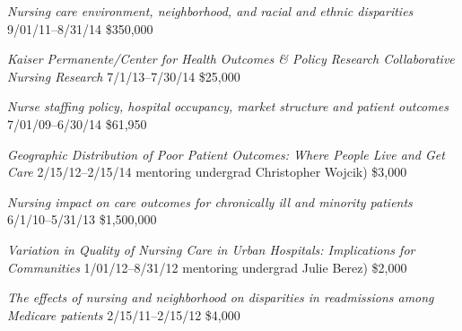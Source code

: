 \documentclass[10pt,]{article}
\begin{document}
{{{{{{{{{{{{{\textit {Nursing care environment, neighborhood, and racial and ethnic disparities} \hfill 9/01/11--8/31/14 \newline
{} \hfill \$350,000

\textit {Kaiser Permanente/Center for Health Outcomes \& Policy Research Collaborative Nursing Research} \hfill 7/1/13--7/30/14 \newline
{} \hfill \$25,000

\textit {Nurse staffing policy, hospital occupancy, market structure and patient outcomes} \hfill 7/01/09--6/30/14 \newline
{} \hfill \$61,950

\textit {Geographic Distribution of Poor Patient Outcomes: Where People Live and Get Care} \hfill 2/15/12--2/15/14 \newline
{ mentoring undergrad Christopher Wojcik)}	\hfill \$3,000

\textit {Nursing impact on care outcomes for chronically ill and minority patients} \hfill 6/1/10--5/31/13 \newline
{}	\hfill \$1,500,000

\textit {Variation in Quality of Nursing Care in Urban Hospitals: Implications for Communities} \hfill 1/01/12--8/31/12 \newline
{ mentoring undergrad Julie Berez)} \hfill \$2,000

\textit {The effects of nursing and neighborhood on disparities in readmissions among Medicare patients} \hfill 2/15/11--2/15/12 \newline
{}	\hfill \$4,000

}}}}}}}}}}}}}
\end{document}
